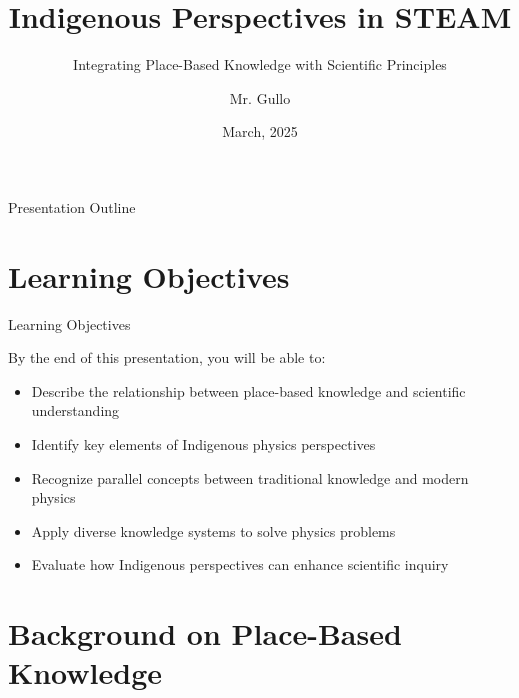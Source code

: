 \documentclass{beamer}
\title[Place-Based Knowledge]{Indigenous Perspectives in STEAM}
\subtitle{Integrating Place-Based Knowledge with Scientific Principles}
\author[Mr. Gullo]{Mr. Gullo}
\institute{Physics Department}
\date[March 2025]{March, 2025}
\begin{document}
\begin{frame}
    \titlepage
\end{frame}

\begin{frame}{Presentation Outline}
    \tableofcontents
\end{frame}

\section{Learning Objectives}

\begin{frame}{Learning Objectives}
    \begin{block}{By the end of this presentation, you will be able to:}
        \begin{itemize}
            \item Describe the relationship between place-based knowledge and scientific understanding
            \item Identify key elements of Indigenous physics perspectives
            \item Recognize parallel concepts between traditional knowledge and modern physics
            \item Apply diverse knowledge systems to solve physics problems
            \item Evaluate how Indigenous perspectives can enhance scientific inquiry
        \end{itemize}
    \end{block}
\end{frame}



\section{Background on Place-Based Knowledge}
\end{document}
